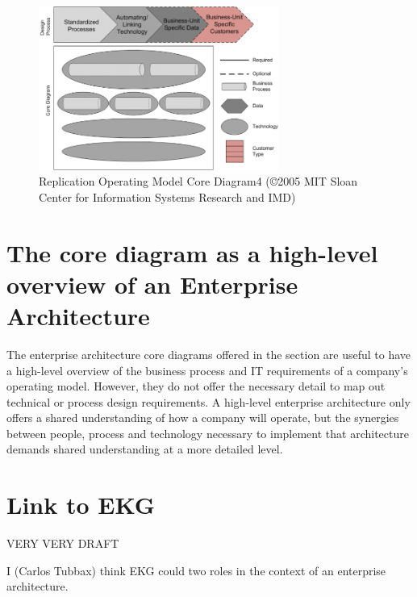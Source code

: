 \begin{figure}[ht]
    \centering
    \includegraphics[width=0.7\textwidth]{../images/replication-operating-model-core-diagram4.png}
    \caption{Replication Operating Model Core Diagram4 (©2005 MIT Sloan Center for Information Systems Research and IMD)}
    \label{fig:ekgmm-ea-replication-operating-model-core-diagram4}
\end{figure}

\section*{The core diagram as a high-level overview of an Enterprise Architecture}

The enterprise architecture core diagrams offered in the section are useful to have a high-level overview of the
business process and IT requirements of a company’s operating model.
However, they do not offer the necessary detail to map out technical or process design requirements.
A high-level enterprise architecture only offers a shared understanding of how a company will operate,
but the synergies between people, process and technology necessary to implement that architecture demands
shared understanding at a more detailed level.

\section*{Link to EKG}

VERY VERY DRAFT

I (Carlos Tubbax) think EKG could two roles in the context of an enterprise architecture.

